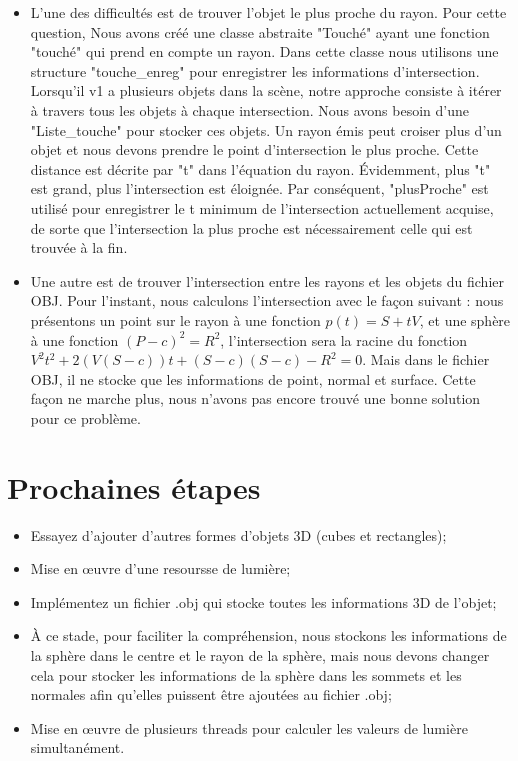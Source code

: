 \documentclass{article}
\begin{document}
\begin{itemize}
\item L'une des difficultés est de trouver l'objet le plus proche du rayon. Pour cette question, Nous avons créé une classe abstraite "Touché" ayant une fonction "touché" qui prend en compte un rayon. Dans cette classe nous utilisons une structure "touche\_enreg" pour enregistrer les informations d'intersection. Lorsqu'il v1 a plusieurs objets dans la scène, notre approche consiste à itérer à travers tous les objets à chaque intersection. Nous avons besoin d'une "Liste\_touche" pour stocker ces objets. Un rayon émis peut croiser plus d'un objet et nous devons prendre le point d'intersection le plus proche. Cette distance est décrite par "t" dans l'équation du rayon. Évidemment, plus "t" est grand, plus l'intersection est éloignée. Par conséquent, "plusProche" est utilisé pour enregistrer le t minimum de l'intersection actuellement acquise, de sorte que l'intersection la plus proche est nécessairement celle qui est trouvée à la fin.
\item Une autre est de trouver l'intersection entre les rayons et les objets du fichier OBJ. Pour l'instant, nous calculons l'intersection avec le façon suivant : nous présentons un point sur le rayon à une fonction $p(t)=S+tV$, et une sphère à une fonction $(P-c)^{2}=R^{2}$, l'intersection sera la racine du fonction $V^{2}t^{2}+2(V(S-c))t+(S-c)(S-c)-R^{2}=0$. Mais dans le fichier OBJ, il ne stocke que les informations de point, normal et surface. Cette façon ne marche plus, nous n'avons pas encore trouvé une bonne solution pour ce problème. 
\end{itemize}

\section{Prochaines étapes}

\begin{itemize}
\item Essayez d'ajouter d'autres formes d'objets 3D (cubes et rectangles);
\item Mise en œuvre d'une resoursse de lumière;
\item Implémentez un fichier .obj qui stocke toutes les informations 3D de l'objet;
\item À ce stade, pour faciliter la compréhension, nous stockons les informations de la sphère dans le centre et le rayon de la sphère, mais nous devons changer cela pour stocker les informations de la sphère dans les sommets et les normales afin qu'elles puissent être ajoutées au fichier .obj;
\item Mise en œuvre de plusieurs threads pour calculer les valeurs de lumière simultanément.
\end{itemize}
\end{document}

